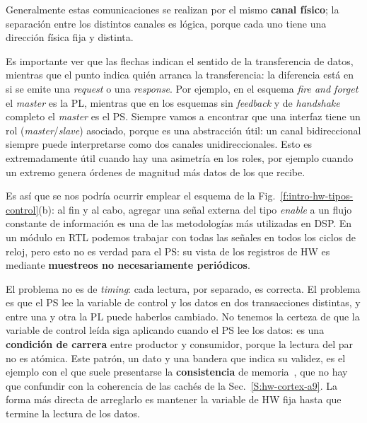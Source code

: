 Generalmente estas comunicaciones se realizan por el mismo \textbf{canal
físico}; la separación entre los distintos canales es lógica, porque cada uno
tiene una dirección física fija y distinta.

Es importante ver que las flechas indican el sentido de la transferencia de
datos, mientras que el punto indica quién arranca la transferencia: la
diferencia está en si se emite una \emph{request} o una \emph{response}. Por
ejemplo, en el esquema \emph{fire and forget} el \emph{master} es la PL, mientras que
en los esquemas sin \emph{feedback} y de \emph{handshake} completo el \emph{master} es el PS. Siempre
vamos a encontrar que una interfaz tiene un rol (\emph{master}/\emph{slave}) asociado, porque
es una abstracción útil: un canal bidireccional siempre puede interpretarse como
dos canales unidireccionales. Esto es extremadamente útil cuando hay una
asimetría en los roles, por ejemplo cuando un extremo genera órdenes de magnitud
más datos de los que recibe. 

Es así que se nos podría ocurrir emplear el esquema de la
Fig.~\ref{f:intro-hw-tipos-control}(b): al fin y al cabo, agregar una señal
externa del tipo \emph{enable} a un flujo constante de información es una de las
metodologías más utilizadas en DSP. En un módulo en RTL podemos trabajar con
todas las señales en todos los ciclos de reloj, pero esto no es verdad para el
PS: su vista de los registros de HW es mediante \textbf{muestreos no
necesariamente periódicos}.

El problema no es de \emph{timing}: cada lectura, por separado, es correcta. El
problema es que el PS lee la variable de control y los datos en dos
transacciones distintas, y entre una y otra la PL puede haberlos cambiado. No
tenemos la certeza de que la variable de control leída siga aplicando cuando el
PS lee los datos: es una \textbf{condición de carrera} entre productor y
consumidor, porque la lectura del par no es atómica. Este patrón, un dato y una
bandera que indica su validez, es el ejemplo con el que suele presentarse la
\textbf{consistencia} de memoria~, que no hay que
confundir con la coherencia de las cachés de la Sec.~\ref{S:hw-cortex-a9}. La
forma más directa de arreglarlo es mantener la variable de HW fija hasta que
termine la lectura de los datos.

